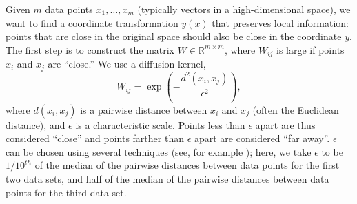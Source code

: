 \documentclass{pnastwo}
\begin{document}
\begin{article}
Given $m$ data points $x_1, \dots, x_m$ (typically vectors in a high-dimensional space), we want to find a coordinate transformation $y(x)$ that preserves local information: points that are close in the original space should also be close in the coordinate $y$.
%
The first step is to construct the matrix $W \in \mathbb{R}^{m \times m}$, where $W_{ij}$ is large if points $x_i$ and $x_j$ are ``close.''
%
We use a diffusion kernel,
\begin{equation} \label{eq:dmaps_W}
W_{ij} = \exp \left( -\frac{d^2(x_i, x_j)}{\epsilon^2} \right),
\end{equation}
where $d(x_i, x_j)$ is a pairwise distance between $x_i$ and $x_j$ (often the Euclidean distance), and $\epsilon$ is a characteristic scale.
%
Points less than $\epsilon$ apart are thus considered ``close'' and points farther than $\epsilon$ apart are considered ``far away''.
%
$\epsilon$ can be chosen using several techniques (see, for example \cite{coifman2008graph, rohrdanz2011determination}); here, we take $\epsilon$ to be $1/10^{th}$ of the median of the pairwise distances between data points for the first two data sets, and half of the median of the pairwise distances between data points for the third data set.


\end{article}
\end{document}
